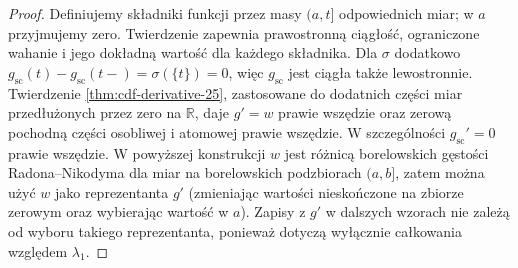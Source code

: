\begin{proof}
Definiujemy składniki funkcji przez masy $(a,t]$
odpowiednich miar; w $a$ przyjmujemy zero.
Twierdzenie  zapewnia
prawostronną ciągłość, ograniczone wahanie i jego dokładną
wartość dla każdego składnika. Dla $\sigma$ dodatkowo
$g_{\mathrm{sc}}(t)-g_{\mathrm{sc}}(t-)=\sigma(\{t\})=0$,
więc $g_{\mathrm{sc}}$ jest ciągła także lewostronnie.
Twierdzenie \ref{thm:cdf-derivative-25}, zastosowane
do dodatnich części miar przedłużonych przez zero na
$\mathbb R$, daje $g'=w$ prawie wszędzie oraz zerową pochodną
części osobliwej i atomowej prawie wszędzie.
W szczególności $g_{\mathrm{sc}}'=0$ prawie wszędzie.
W powyższej konstrukcji $w$ jest różnicą borelowskich
gęstości Radona--Nikodyma dla miar na borelowskich
podzbiorach $(a,b]$, zatem można użyć $w$ jako
reprezentanta $g'$ (zmieniając wartości nieskończone
na zbiorze zerowym oraz wybierając wartość w $a$).
Zapisy z $g'$ w dalszych wzorach nie zależą od
wyboru takiego reprezentanta, ponieważ dotyczą
wyłącznie całkowania względem $\lambda_1$.


\end{proof}
